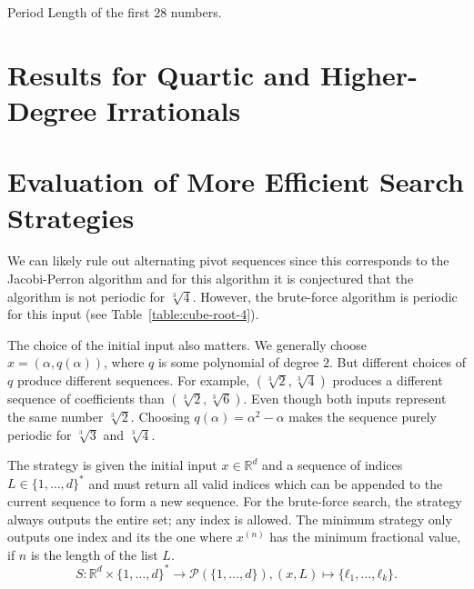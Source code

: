 \begin{table}[t]
  \caption{Period Length of the first $28$ numbers.}
  \centering
  
\end{table}

\section{Results for Quartic and Higher-Degree Irrationals}

\section{Evaluation of More Efficient Search Strategies}

We can likely rule out alternating pivot sequences since this corresponds to
the Jacobi-Perron algorithm and for this algorithm it is conjectured
\cite{Karpenkov21} that the algorithm is not periodic for $\sqrt[3]{4}$.
However, the brute-force algorithm is periodic for this input (see Table~\ref{table:cube-root-4}).

The choice of the initial input also matters.
We generally choose $x = (α, q(α))$, where $q$ is some polynomial of degree $2$.
But different choices of $q$ produce different sequences.
For example, $(\sqrt[3]{2}, \sqrt[3]{4})$ produces a different sequence of coefficients than $(\sqrt[3]{2}, \sqrt[3]{6})$.
Even though both inputs represent the same number $\sqrt[3]{2}$.
Choosing $q(α) = α^2 - α$ makes the sequence purely periodic for $\sqrt[3]{3}$ and $\sqrt[3]{4}$.

The strategy is given the initial input $x ∈ ℝ^d$ and a sequence of indices $L ∈ \{1, …, d\}^*$ and must
return all valid indices which can be appended to the current sequence to form
a new sequence.
For the brute-force search, the strategy always outputs the entire set; any index is allowed.
The minimum strategy only outputs one index and its the one where $x^{(n)}$ has
the minimum fractional value, if $n$ is the length of the list $L$.
\[
  S \colon ℝ^d × \{1, …, d\}^* → \mathcal P(\{1, …, d\}), (x, L) ↦ \{ℓ_1, …, ℓ_k\}.
\]

